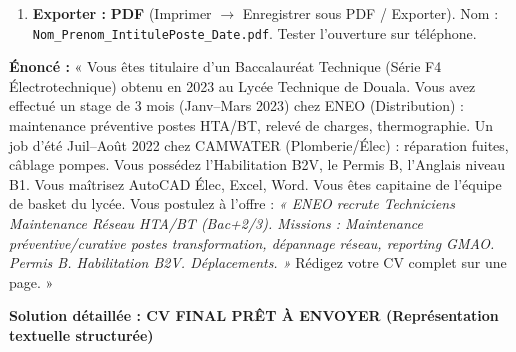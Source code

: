 \documentclass[11pt]{article}
\begin{document}
\begin{methode}
\begin{enumerate}
\begin{enumerate}
                  \item \textbf{Lisibilité :} Police unique, tailles cohérentes, alignements parfaits (tabulations, pas espaces), puces alignées, marges régulières.
                  \item \textbf{Identité numérique :} Email pro, LinkedIn à jour (cohérence CV/LinkedIn), pas de photo Facebook en lien.
              \end{enumerate}
        \item \textbf{Exporter :} \textbf{PDF} (Imprimer $\rightarrow$ Enregistrer sous PDF / Exporter). Nom : \texttt{Nom\_Prenom\_IntitulePoste\_Date.pdf}. Tester l'ouverture sur téléphone.
    \end{enumerate}
\end{methode}

\begin{exoresolu}
    \textbf{Énoncé :} « Vous êtes titulaire d'un Baccalauréat Technique (Série F4 Électrotechnique) obtenu en 2023 au Lycée Technique de Douala. Vous avez effectué un stage de 3 mois (Janv--Mars 2023) chez ENEO (Distribution) : maintenance préventive postes HTA/BT, relevé de charges, thermographie. Un job d'été Juil--Août 2022 chez CAMWATER (Plomberie/Élec) : réparation fuites, câblage pompes. Vous possédez l'Habilitation B2V, le Permis B, l'Anglais niveau B1. Vous maîtrisez AutoCAD Élec, Excel, Word. Vous êtes capitaine de l'équipe de basket du lycée. Vous postulez à l'offre : \emph{« ENEO recrute Techniciens Maintenance Réseau HTA/BT (Bac+2/3). Missions : Maintenance préventive/curative postes transformation, dépannage réseau, reporting GMAO. Permis B. Habilitation B2V. Déplacements. »} Rédigez votre CV complet sur une page. »

    \tcblower
    \textbf{Solution détaillée : CV FINAL PRÊT À ENVOYER (Représentation textuelle structurée)}


\end{exoresolu}
\end{document}
